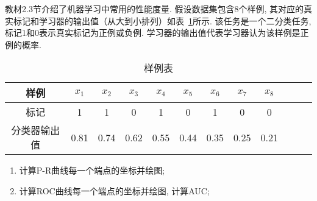 \documentclass[answers]{exam}  %
\begin{document}
\begin{questions}
  教材2.3节介绍了机器学习中常用的性能度量. 假设数据集包含8个样例, 其对应的真实标记和学习器的输出值（从大到小排列）如表~\ref{table:roc}所示. 该任务是一个二分类任务, 标记1和0表示真实标记为正例或负例.
  学习器的输出值代表学习器认为该样例是正例的概率.
  \begin{table}[!h]
    \centering
    \caption{样例表} \vspace{2mm}\label{table:roc}
    \begin{tabular}{c|c c c c c c c c c c c}\toprule
      样例         & $x_1$ & $x_2$ & $x_3$ & $x_4$ & $x_5$ & $x_{6}$ & $x_{7}$ & $x_{8}$ \\
      \midrule
      标记         & 1     & 1     & 0     & 1     & 0     & 1       & 0       & 0       \\
      \midrule
      分类器输出值 & 0.81  & 0.74  & 0.62  & 0.55  & 0.44  & 0.35    & 0.25    & 0.21    \\
      \bottomrule
    \end{tabular}
  \end{table}
  \begin{enumerate}
    \item 计算P-R曲线每一个端点的坐标并绘图;
    \item 计算ROC曲线每一个端点的坐标并绘图, 计算AUC;
  \end{enumerate}
  \begin{solution}
  \end{solution}

\end{questions}
\end{document}
